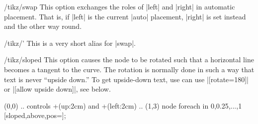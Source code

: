 \begin{key}{/tikz/swap}
  This option exchanges the roles of |left| and |right| in automatic
  placement. That is, if |left| is the current |auto| placement,
  |right| is set instead and the other way round.
\begin{codeexample}[]
\end{codeexample}
\begin{codeexample}[]
\end{codeexample}
\end{key}

\begin{key}{/tikz/'}
  This is a very short alias for |swap|.  
\end{key}

\begin{key}{/tikz/sloped}
  This option causes the node to be rotated such that a horizontal
  line becomes a tangent to the curve. The rotation is normally
  done in such a way that text is never ``upside down.'' To get
  upside-down text, use can use |[rotate=180]| or
  |[allow upside down]|, see below.
\begin{codeexample}[]
\tikz \draw (0,0) .. controls +(up:2cm) and +(left:2cm) .. (1,3)
    node foreach \p in {0,0.25,...,1} [sloped,above,pos=\p]{\p};
\end{codeexample}
\begin{codeexample}[]
\end{codeexample}
\end{key}


